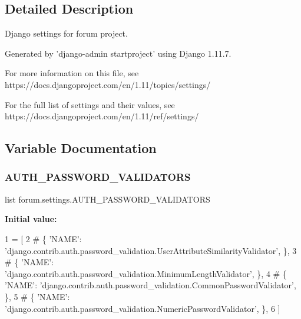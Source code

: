 \subsection{Detailed Description}
\begin{DoxyVerb}Django settings for forum project.

Generated by 'django-admin startproject' using Django 1.11.7.

For more information on this file, see
https://docs.djangoproject.com/en/1.11/topics/settings/

For the full list of settings and their values, see
https://docs.djangoproject.com/en/1.11/ref/settings/
\end{DoxyVerb}
 

\subsection{Variable Documentation}
\mbox{\label{namespaceforum_1_1settings_aae55f9e42d8a098c8c3b96d217ec1b11}} 
\subsubsection{\texorpdfstring{A\+U\+T\+H\+\_\+\+P\+A\+S\+S\+W\+O\+R\+D\+\_\+\+V\+A\+L\+I\+D\+A\+T\+O\+RS}{AUTH\_PASSWORD\_VALIDATORS}}
{\footnotesize\ttfamily list forum.\+settings.\+A\+U\+T\+H\+\_\+\+P\+A\+S\+S\+W\+O\+R\+D\+\_\+\+V\+A\+L\+I\+D\+A\+T\+O\+RS}

{\bfseries Initial value\+:}
\begin{DoxyCode}
1 =  [
2     \textcolor{comment}{# \{ 'NAME': 'django.contrib.auth.password\_validation.UserAttributeSimilarityValidator', \},}
3     \textcolor{comment}{# \{ 'NAME': 'django.contrib.auth.password\_validation.MinimumLengthValidator', \},}
4     \textcolor{comment}{# \{ 'NAME': 'django.contrib.auth.password\_validation.CommonPasswordValidator', \},}
5     \textcolor{comment}{# \{ 'NAME': 'django.contrib.auth.password\_validation.NumericPasswordValidator', \},}
6 ]
\end{DoxyCode}
\mbox{\label{namespaceforum_1_1settings_a44197964b633b5b1c4d2192238f04885}} 
